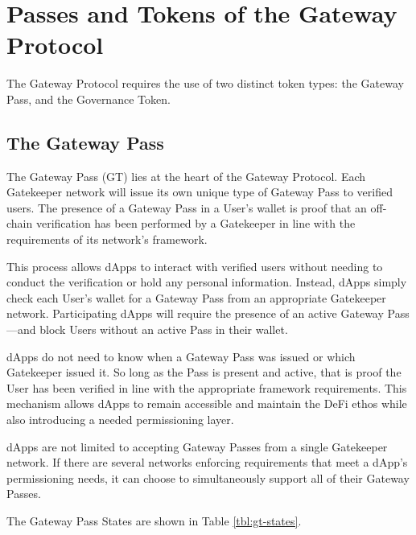 \section{Passes and Tokens of the Gateway Protocol}\label{sec:tokens}
The Gateway Protocol requires the use of two distinct token types: the Gateway Pass, and the Governance Token.

\subsection{The Gateway Pass}
The Gateway Pass (GT) lies at the heart of the Gateway Protocol. Each Gatekeeper network will issue its own unique type
of Gateway Pass to verified users. The presence of a Gateway Pass in a User’s wallet is proof that an off-chain
verification has been performed by a Gatekeeper in line with the requirements of its network’s framework.

This process allows dApps to interact with verified users without needing to conduct the verification or hold any
personal information. Instead, dApps simply check each User’s wallet for a Gateway Pass from an appropriate Gatekeeper
network. Participating dApps will require the presence of an active Gateway Pass—and block Users without an active Pass
in their wallet.

dApps do not need to know when a Gateway Pass was issued or which Gatekeeper issued it. So long as the Pass is present
and active, that is proof the User has been verified in line with the appropriate framework requirements. This mechanism
allows dApps to remain accessible and maintain the DeFi ethos while also introducing a needed permissioning layer.

dApps are not limited to accepting Gateway Passes from a single Gatekeeper network. If there are several networks
enforcing requirements that meet a dApp’s permissioning needs, it can choose to simultaneously support all of their
Gateway Passes.

The Gateway Pass States are shown in Table \ref{tbl:gt-states}.
\clearpage

